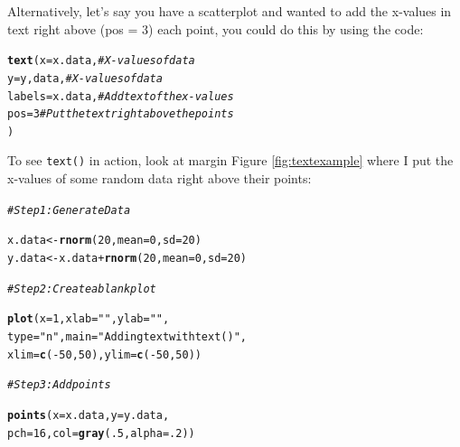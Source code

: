 \documentclass{tufte-book}\usepackage[]{graphicx}\usepackage[]{color}
\makeatletter
\newcommand{\hlnum}[1]{\textcolor[rgb]{0.686,0.059,0.569}{#1}}%
\newcommand{\hlstr}[1]{\textcolor[rgb]{0.192,0.494,0.8}{#1}}%
\newcommand{\hlcom}[1]{\textcolor[rgb]{0.678,0.584,0.686}{\textit{#1}}}%
\newcommand{\hlopt}[1]{\textcolor[rgb]{0,0,0}{#1}}%
\newcommand{\hlstd}[1]{\textcolor[rgb]{0.345,0.345,0.345}{#1}}%
\newcommand{\hlkwb}[1]{\textcolor[rgb]{0.69,0.353,0.396}{#1}}%
\newcommand{\hlkwc}[1]{\textcolor[rgb]{0.333,0.667,0.333}{#1}}%
\newcommand{\hlkwd}[1]{\textcolor[rgb]{0.737,0.353,0.396}{\textbf{#1}}}%
\newenvironment{kframe}{%
 \def\at@end@of@kframe{}%
 \ifinner\ifhmode%
  \def\at@end@of@kframe{\end{minipage}}%
  \begin{minipage}{\columnwidth}%
 \fi\fi%
 \def\FrameCommand##1{\hskip\@totalleftmargin \hskip-\fboxsep
 \colorbox{shadecolor}{##1}\hskip-\fboxsep
     \hskip-\linewidth \hskip-\@totalleftmargin \hskip\columnwidth}%
 \MakeFramed {\advance\hsize-\width
   \@totalleftmargin\z@ \linewidth\hsize
   \@setminipage}}%
 {\par\unskip\endMakeFramed%
 \at@end@of@kframe}
\newenvironment{knitrout}{}{} %
\makeatother
\begin{document}
\begin{footnotesize}
Alternatively, let's say you have a scatterplot and wanted to add the x-values in text right above (pos = 3) each point, you could do this by using the code:

\begin{knitrout}
\color{fgcolor}\begin{kframe}
\begin{alltt}
\hlkwd{text}\hlstd{(}\hlkwc{x} \hlstd{= x.data,} \hlcom{# X-values of data}
     \hlkwc{y} \hlstd{= y,data,} \hlcom{# X-values of data}
     \hlkwc{labels} \hlstd{= x.data,} \hlcom{# Add text of the x-values}
     \hlkwc{pos} \hlstd{=} \hlnum{3} \hlcom{# Put the text right above the points}
     \hlstd{)}
\end{alltt}
\end{kframe}
\end{knitrout}

To see \texttt{text()} in action, look at margin Figure \ref{fig:textexample} where I put the x-values of some random data right above their points:

\begin{marginfigure}
\begin{tiny}
\begin{knitrout}
\color{fgcolor}\begin{kframe}
\begin{alltt}
\hlcom{# Step 1: Generate Data}

\hlstd{x.data} \hlkwb{<-} \hlkwd{rnorm}\hlstd{(}\hlnum{20}\hlstd{,} \hlkwc{mean} \hlstd{=} \hlnum{0}\hlstd{,} \hlkwc{sd} \hlstd{=} \hlnum{20}\hlstd{)}
\hlstd{y.data} \hlkwb{<-} \hlstd{x.data} \hlopt{+} \hlkwd{rnorm}\hlstd{(}\hlnum{20}\hlstd{,} \hlkwc{mean} \hlstd{=} \hlnum{0}\hlstd{,} \hlkwc{sd} \hlstd{=} \hlnum{20}\hlstd{)}

\hlcom{# Step 2:  Create a blank plot}

\hlkwd{plot}\hlstd{(}\hlkwc{x} \hlstd{=} \hlnum{1}\hlstd{,} \hlkwc{xlab} \hlstd{=} \hlstr{""}\hlstd{,} \hlkwc{ylab} \hlstd{=} \hlstr{""}\hlstd{,}
     \hlkwc{type} \hlstd{=} \hlstr{"n"}\hlstd{,} \hlkwc{main} \hlstd{=} \hlstr{"Adding text with text()"}\hlstd{,}
     \hlkwc{xlim} \hlstd{=} \hlkwd{c}\hlstd{(}\hlopt{-}\hlnum{50}\hlstd{,} \hlnum{50}\hlstd{),} \hlkwc{ylim} \hlstd{=} \hlkwd{c}\hlstd{(}\hlopt{-}\hlnum{50}\hlstd{,} \hlnum{50}\hlstd{))}

\hlcom{# Step 3: Add points}

\hlkwd{points}\hlstd{(}\hlkwc{x} \hlstd{= x.data,} \hlkwc{y} \hlstd{= y.data,}
       \hlkwc{pch} \hlstd{=} \hlnum{16}\hlstd{,} \hlkwc{col} \hlstd{=} \hlkwd{gray}\hlstd{(}\hlnum{.5}\hlstd{,} \hlkwc{alpha} \hlstd{=} \hlnum{.2}\hlstd{))}


\end{alltt}
\end{kframe}
\end{knitrout}
\end{tiny}
\end{marginfigure}
\end{footnotesize}
\end{document}
